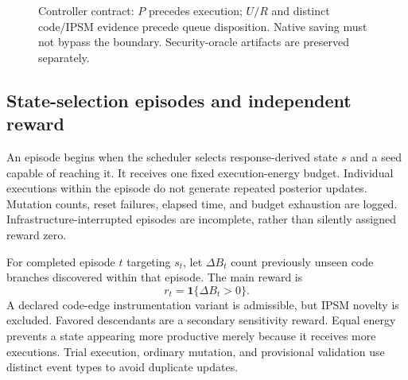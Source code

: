 \documentclass[final,5p,times,number]{elsarticle}
\newcommand{\gcode}{G_{\mathrm{code}}}
\newcommand{\gstate}{G_{\mathrm{state}}}
\begin{document}
\begin{figure}[!tbp]
\centering
{}
\caption{Controller contract: $P$ precedes execution; $U/R$ and distinct code/IPSM evidence precede queue disposition. Native saving must not bypass the boundary. Security-oracle artifacts are preserved separately.}
\label{fig:architecture}
\end{figure}

\subsection{State-selection episodes and independent reward}
An episode begins when the scheduler selects response-derived state $s$ and a seed capable of reaching it. It receives one fixed execution-energy budget. Individual executions within the episode do not generate repeated posterior updates. Mutation counts, reset failures, elapsed time, and budget exhaustion are logged. Infrastructure-interrupted episodes are incomplete, rather than silently assigned reward zero.

For completed episode $t$ targeting $s_t$, let $\Delta B_t$ count previously unseen code branches discovered within that episode. The main reward is
\begin{equation}
r_t=\mathbf{1}\{\Delta B_t>0\}.
\label{eq:reward}
\end{equation}
A declared code-edge instrumentation variant is admissible, but IPSM novelty is excluded. Favored descendants are a secondary sensitivity reward. Equal energy prevents a state appearing more productive merely because it receives more executions. Trial execution, ordinary mutation, and provisional validation use distinct event types to avoid duplicate updates.
\end{document}

